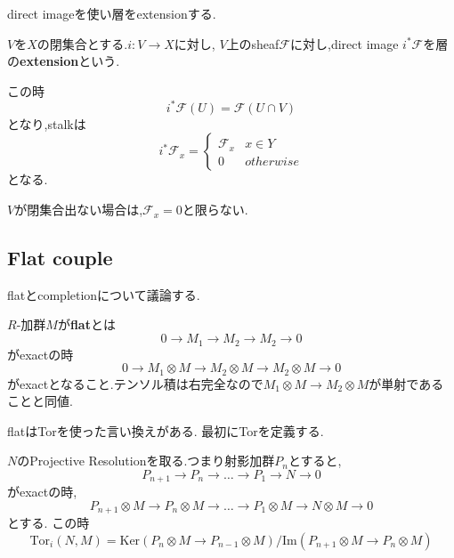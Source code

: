 direct imageを使い層をextensionする.
\begin{screen}
\begin{dfn}
$V$を$X$の閉集合とする.$i : V \to X$に対し,
$V$上のsheaf$\mathcal{F}$に対し,direct image $i^*\mathcal{F}$を層の\textbf{extension}という.

この時
\begin{equation*}
    i^* \mathcal{F}(U) = \mathcal{F}(U \cap V)
\end{equation*}
となり,stalkは
\begin{equation*}
    i^*\mathcal{F}_x = \begin{cases}
        \mathcal{F}_x & x \in Y \\
        0 & otherwise
    \end{cases}
\end{equation*}
となる.
\end{dfn}
\end{screen}

\begin{rem}
  $V$が閉集合出ない場合は,$\mathcal{F}_x = 0$と限らない.
\end{rem}

\subsection{Flat couple}
flatとcompletionについて議論する.

\begin{screen}
\begin{dfn}
$R$-加群$M$が\textbf{flat}とは
\begin{equation*}
 0 \to M_1 \to M_2 \to M_2 \to 0
\end{equation*}
がexactの時
\begin{equation*}
 0 \to M_1 \otimes M \to M_2 \otimes M\to M_2 \otimes M \to 0
\end{equation*}
がexactとなること.テンソル積は右完全なので$M_1 \otimes M \to M_2 \otimes M$が単射であることと同値.
\end{dfn}
\end{screen}

flatはTorを使った言い換えがある.
最初にTorを定義する.
\begin{screen}
\begin{dfn}
$N$のProjective Resolutionを取る.つまり射影加群$P_n$とすると,
\begin{equation*}
P_{n+1} \to P_n \to \ldots \to P_1 \to N \to 0
\end{equation*}
がexactの時,
\begin{equation*}
P_{n+1} \otimes M \to P_n \otimes M  \to \ldots \to P_1 \otimes M \to N \otimes M \to 0
\end{equation*}
とする.
この時
\begin{equation*}
\mathrm{Tor}_i(N, M) = \mathrm{Ker}(P_n \otimes M \to P_{n-1} \otimes M) / \mathrm{Im}(P_{n+1} \otimes M  \to P_n \otimes M)
\end{equation*}
\end{dfn}
\end{screen}


